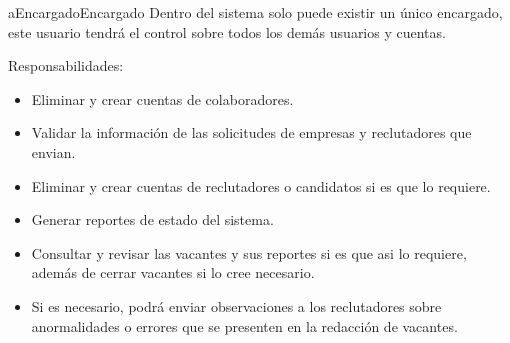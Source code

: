 \begin{actor}{aEncargado}{Encargado}{%
    Dentro del sistema solo puede existir un único encargado, este usuario tendrá el control sobre todos los demás usuarios y cuentas.
   }   
   \item[Responsabilidades:] \hfill
    \begin{itemize}
        \item Eliminar y crear cuentas de colaboradores.
        \item Validar la información de las solicitudes de empresas y reclutadores que envian.
        \item Eliminar y crear cuentas de reclutadores o candidatos si es que lo requiere.
        \item Generar reportes de estado del sistema.
        \item Consultar y revisar las vacantes y sus reportes si es que asi lo requiere, además de cerrar vacantes si lo cree necesario.
        \item Si es necesario, podrá enviar observaciones a los reclutadores sobre anormalidades o errores que se presenten en la redacción de vacantes.
    \end{itemize}

\end{actor}